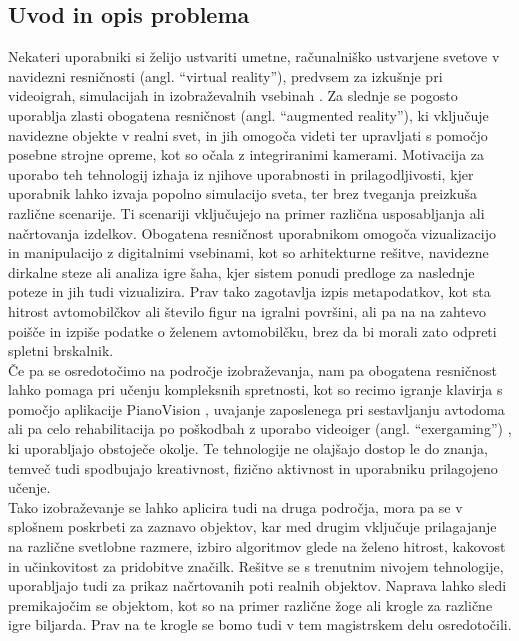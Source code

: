 \documentclass[a4paper, 12pt]{article}
\begin{document}
\subsection{Uvod in opis problema}
Nekateri uporabniki si želijo ustvariti umetne, računalniško ustvarjene svetove v navidezni resničnosti (angl. ``virtual reality''), predvsem za izkušnje pri videoigrah, simulacijah in izobraževalnih vsebinah \cite{Qingtian2024}. Za slednje se pogosto uporablja zlasti obogatena resničnost (angl. ``augmented reality''), ki vključuje navidezne objekte v realni svet, in jih omogoča videti ter upravljati s pomočjo posebne strojne opreme, kot so očala z integriranimi kamerami.
Motivacija za uporabo teh tehnologij izhaja iz njihove uporabnosti in prilagodljivosti, kjer uporabnik lahko izvaja popolno simulacijo sveta, ter brez tveganja preizkuša različne scenarije. Ti scenariji vključujejo na primer različna usposabljanja ali načrtovanja izdelkov. Obogatena resničnost uporabnikom omogoča vizualizacijo in manipulacijo z digitalnimi vsebinami, kot so arhitekturne rešitve, navidezne dirkalne steze ali analiza igre šaha, kjer sistem ponudi predloge za naslednje poteze in jih tudi vizualizira. Prav tako zagotavlja izpis metapodatkov, kot sta hitrost avtomobilčkov ali število figur na igralni površini, ali pa na na zahtevo poišče in izpiše podatke o želenem avtomobilčku, brez da bi morali zato odpreti spletni brskalnik.\\
Če pa se osredotočimo na področje izobraževanja, nam pa obogatena resničnost lahko pomaga pri učenju kompleksnih spretnosti, kot so recimo igranje klavirja s pomočjo aplikacije PianoVision \cite{McKenzie2022PianoVision}, uvajanje zaposlenega pri sestavljanju avtodoma ali pa celo rehabilitacija po poškodbah z uporabo videoiger (angl. ``exergaming'') \cite{Chow2023Exergaming}, ki uporabljajo obstoječe okolje. Te tehnologije ne olajšajo dostop le do znanja, temveč tudi spodbujajo kreativnost, fizično aktivnost in uporabniku prilagojeno učenje.\\
Tako izobraževanje se lahko aplicira tudi na druga področja, mora pa se v splošnem poskrbeti za zaznavo objektov, kar med drugim vključuje prilagajanje na različne svetlobne razmere, izbiro algoritmov glede na želeno hitrost, kakovost in učinkovitost za pridobitve značilk. Rešitve se s trenutnim nivojem tehnologije, uporabljajo tudi za prikaz načrtovanih poti realnih objektov. Naprava lahko sledi premikajočim se objektom, kot so na primer različne žoge ali krogle za različne igre biljarda. Prav na te krogle se bomo tudi v tem magistrskem delu osredotočili.
\end{document}
